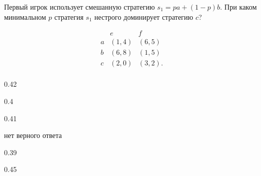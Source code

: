 
\begin{question}
Первый игрок использует смешанную стратегию \(s_1 = p a + (1-p)b\). При
каком минимальном \(p\) стратегия \(s_1\) нестрого доминирует стратегию
\(c\)?

\[
\begin{matrix}
   & e & f \\
a  & (1, 4) & (6, 5) \\
b  & (6, 8) & (1, 5) \\
c  & (2, 0) & (3, 2). \\
\end{matrix}
\]
\begin{answerlist}
  \item 0.42
  \item 0.4
  \item 0.41
  \item нет верного ответа
  \item 0.39
  \item 0.45
\end{answerlist}
\end{question}


